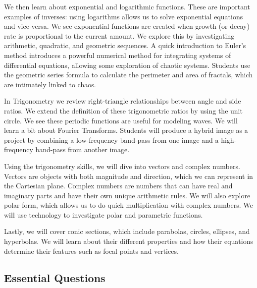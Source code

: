 \documentclass[12pt]{article}
\begin{document}
We then learn about exponential and logarithmic functions. These are important examples of inverses: using logarithms allows us to solve exponential equations and vice-versa. We see  exponential functions are created when growth (or decay) rate is proportional to the current amount. We explore this by investigating arithmetic, quadratic, and geometric sequences. A quick introduction to Euler's method introduces a powerful numerical method for integrating systems of differential equations, allowing some exploration of chaotic systems. Students use the geometric series formula to calculate the perimeter and area of fractals, which are intimately linked to chaos.

In Trigonometry we review right-triangle relationships between angle and side ratios. We extend the definition of these trigonometric ratios by using the unit circle. We see these periodic functions are useful for modeling waves. We will learn a bit about Fourier Transforms. Students will produce a hybrid image as a project by combining a low-frequency band-pass from one image and a high-frequency band-pass from another image.

Using the trigonometry skills, we will dive into vectors and complex numbers. Vectors are objects with both magnitude and direction, which we can represent in the Cartesian plane. Complex numbers are numbers that can have real and imaginary parts and have their own unique arithmetic rules. We will also explore polar form, which allows us to do quick multiplication with complex numbers. We will use technology to investigate polar and parametric functions.

Lastly, we will cover conic sections, which include parabolas, circles, ellipses, and hyperbolas. We will learn about their different properties and how their equations determine their features such as focal points and vertices.

\subsection*{Essential Questions}
\end{document}
